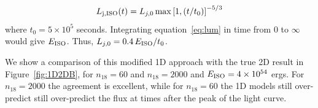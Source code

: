 \documentclass[usenatbib,fleqn]{mnras}
\begin{document}
\begin{equation}\label{eq:lum}
L_{\rm j, ISO}(t) = L_{j,0}\max\left[1, (t/t_0)\right]^{-5/3}
\end{equation}
%
where $t_0 = 5\times 10^5$ seconds. Integrating equation~\ref{eq:lum}
in time from $0$ to $\infty$ would give $E_{\rm ISO}$. Thus,
$L_{j,0}=0.4\, E_{\rm ISO}/t_0$. 

We show a comparison of this modified 1D approach with the true 2D
result in Figure~\ref{fig:1D2DB}, for $n_{18}=60$ and $n_{18}=2000$
and $E_{\rm ISO}=4 \times 10^{54}$ ergs. For $n_{18}=2000$ the
agreement is excellent, while for $n_{18}=60$ the 1D models still
over-predict still over-predict the flux at times after the peak of
the light curve.

\end{document}

